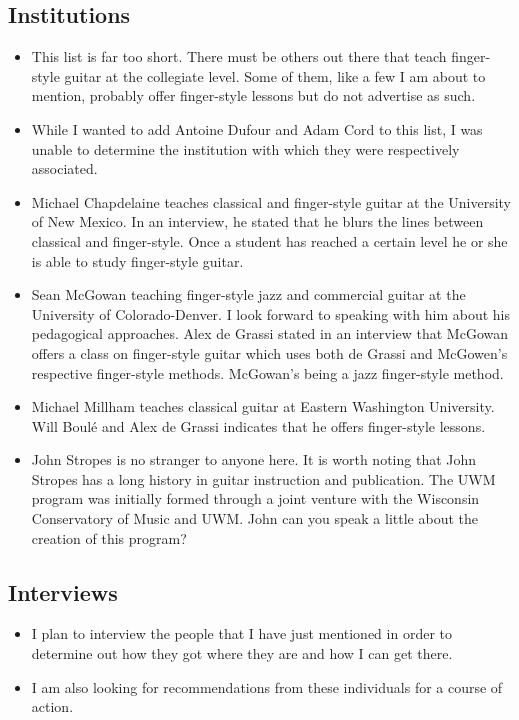 \documentclass[11pt]{article}
\begin{document}
\subsection{Institutions}
\label{sec-1-3}
\begin{itemize}
\item This list is far too short. There must be others out there that teach
finger-style guitar at the collegiate level. Some of them, like a few I am
about to mention, probably offer finger-style lessons but do not advertise
as such.
\item While I wanted to add Antoine Dufour and Adam Cord to this list, I was
unable to determine the institution with which they were respectively
associated.
\item Michael Chapdelaine teaches classical and finger-style guitar at the
University of New Mexico. In an interview, he stated that he blurs the
lines between classical and finger-style. Once a student has reached a
certain level he or she is able to study finger-style guitar.
\item Sean McGowan teaching finger-style jazz and commercial guitar at the
University of Colorado-Denver. I look forward to speaking with him about
his pedagogical approaches. Alex de Grassi stated in an interview that
McGowan offers a class on finger-style guitar which uses both de Grassi and
McGowen's respective finger-style methods. McGowan's being a jazz
finger-style method.
\item Michael Millham teaches classical guitar at Eastern Washington
University. Will Boulé and Alex de Grassi indicates that he offers
finger-style lessons.
\item John Stropes is no stranger to anyone here. It is worth noting that John
Stropes has a long history in guitar instruction and publication. The UWM
program was initially formed through a joint venture with the Wisconsin
Conservatory of Music and UWM. John can you speak a little about the
creation of this program?
\end{itemize}

\subsection{Interviews}
\label{sec-1-4}
\begin{itemize}
\item I plan to interview the people that I have just mentioned in order to
determine out how they got where they are and how I can get there.
\item I am also looking for recommendations from these individuals for a course
of action.
\end{itemize}
\end{document}
